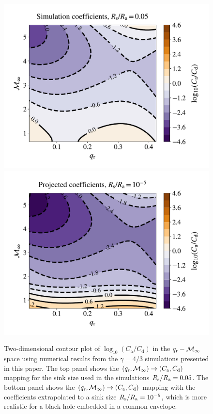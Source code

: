 \begin{figure}[t]
\centering
  \includegraphics[width=11.5cm]{figures/common_envelope/log_ratio_mdot_drag_inc_mdotdrag_3_fit_to_runs_g43_contour_rs5e-2.pdf}
  \includegraphics[width=11.5cm]{figures/common_envelope/log_ratio_mdot_drag_inc_mdotdrag_3_fit_to_runs_g43_contour_rs1e-5.pdf}
\caption{Two-dimensional contour plot of $\log_{10}(C_{\mathrm a}/C_{\mathrm d})$ in the $q_{\rm r}-\mathcal{M}_\infty$ space using numerical results from the $\gamma = 4/3$ simulations presented in this paper. The top panel shows the $(q_{\rm r}, \mathcal{M}_\infty) \rightarrow (C_{\mathrm a}, C_{\mathrm d})$ mapping for the sink size used in the simulations $R_{\rm s}/R_{\rm a} = 0.05$. The bottom panel shows the $(q_{\rm r}, \mathcal{M}_\infty) \rightarrow (C_{\mathrm a}, C_{\mathrm d})$ mapping with the coefficients extrapolated to a sink size $R_{\rm s}/R_{\rm a} = 10^{-5}$, which is more realistic for a black hole embedded in a common envelope.\label{fig:mdot_fdf_ratio_rs05_rs1e-5}}
\vspace{5mm}
\end{figure}

